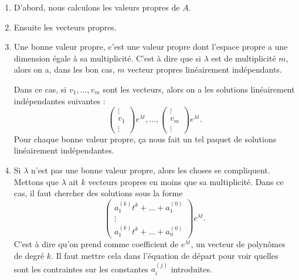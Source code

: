 \let\oldTheEnumi\theenumi
\renewcommand{\theenumi}{\arabic{enumi}}
\begin{enumerate}

\item 
D'abord, nous calculons les valeurs propres de $A$.

\item
Ensuite les vecteurs propres.

\item\label{ItemRapSystDc}
Une bonne valeur propre, c'est une valeur propre dont l'espace propre a une dimension égale à sa multiplicité. C'est à dire que si $\lambda$ est de multiplicité $m$, alors on a, dans les bon cas,  $m$ vecteur propres linéairement indépendants.

Dans ce cas, si $v_1,\ldots,v_m$ sont les vecteurs, alors on a les solutions linéairement indépendantes suivantes :
\begin{equation}
	\begin{pmatrix}
	\vdots	\\ 
	v_1	\\ 
		\vdots	
\end{pmatrix} e^{\lambda t},\ldots,
\begin{pmatrix}
	\vdots		\\ 
	v_m	\\ 
	\vdots		
\end{pmatrix} e^{\lambda t}.
\end{equation}
Pour chaque bonne valeur propre, ça nous fait un tel paquet de solutions linéairement indépendantes.

\item
Si $\lambda$ n'est pas une bonne valeur propre, alors les choses se compliquent. Mettons que $\lambda$ ait $k$ vecteurs propres en moins que sa multiplicité. Dans ce cas, il faut chercher des solutions sous la forme
\begin{equation}		\label{EqEqRapAsTestPolk}
	 \begin{pmatrix}
	a^{(k)}_1t^k+\ldots+a_1^{(0)}	\\ 
	\vdots	\\ 
	a^{(k)}_1t^k+\ldots+a_n^{(0)}		
\end{pmatrix} e^{\lambda t}.
\end{equation}
C'est à dire qu'on prend comme coefficient de $ e^{\lambda t}$, un vecteur de polynômes de degré $k$. Il faut mettre cela dans l'équation de départ pour voir quelles sont les contraintes sur les constantes $a_i^{(j)}$ introduites.


\end{enumerate}
